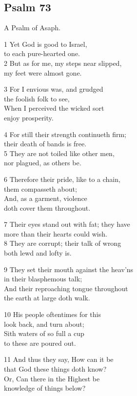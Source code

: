 \subsection*{Psalm 73}

A Psalm of Asaph.

1 Yet God is good to Israel,\\
to each pure-hearted one.\\
2 But as for me, my steps near slipped,\\
my feet were almost gone.

3 For I envious was, and grudged\\
the foolish folk to see,\\
When I perceived the wicked sort\\
enjoy prosperity.

4 For still their strength continueth firm;\\
their death of bands is free.\\
5 They are not toiled like other men,\\
nor plagued, as others be.

6 Therefore their pride, like to a chain,\\
them compasseth about;\\
And, as a garment, violence\\
doth cover them throughout.

7 Their eyes stand out with fat; they have\\
more than their hearts could wish.\\
8 They are corrupt; their talk of wrong\\
both lewd and lofty is.

9 They set their mouth against the heav’ns\\
in their blasphemous talk;\\
And their reproaching tongue throughout\\
the earth at large doth walk.

10 His people oftentimes for this\\
look back, and turn about;\\
Sith waters of so full a cup\\
to these are poured out.

11 And thus they say, How can it be\\
that God these things doth know?\\
Or, Can there in the Highest be\\
knowledge of things below?

